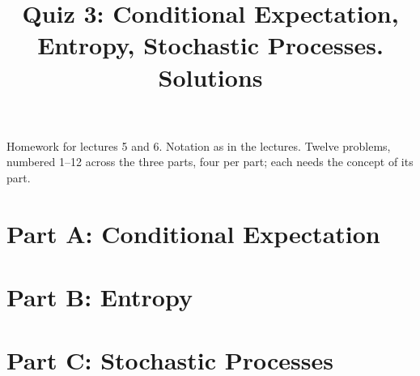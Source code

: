 \documentclass[11pt,a4paper]{article}
\title{Quiz 3: Conditional Expectation, Entropy, Stochastic Processes. Solutions}\author{}\date{}
\begin{document}
\maketitle
\noindent Homework for lectures 5 and 6. Notation as in the lectures. Twelve problems, numbered 1--12 across the three parts, four per part; each needs the concept of its part.
\section*{Part A: Conditional Expectation}

\section*{Part B: Entropy}

\section*{Part C: Stochastic Processes}

\end{document}

